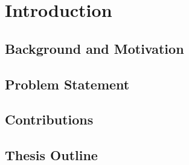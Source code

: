 \chapter{Introduction}
\label{ch:introduction}


\section{Background and Motivation}

\section{Problem Statement}

\section{Contributions}

\section{Thesis Outline}
